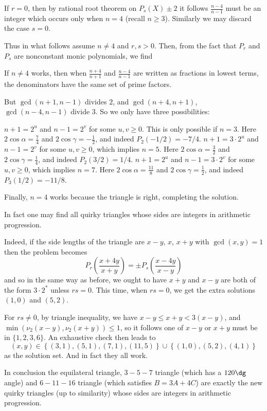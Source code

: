 If $r=0$, then by rational root theorem on $P_s(X) \pm 2$ it follows
$\frac{n-4}{n-1}$ must be an integer which occurs only when $n = 4$ (recall $n \ge 3$).
Similarly we may discard the case $s = 0$.

Thus in what follows assume $n \neq 4$ and $r,s > 0$.
Then, from the fact that $P_r$ and $P_s$ are nonconstant
monic polynomials, we find
\begin{corollary*}
  If $n \neq 4$ works, then when $\frac{n+4}{n+1}$
  and $\frac{n-4}{n-1}$ are written as fractions in lowest terms,
  the denominators have the same set of prime factors.
\end{corollary*}
But $\gcd(n+1, n-1)$ divides $2$, and $\gcd(n+4, n+1)$, $\gcd(n-4,n-1)$ divide $3$.
So we only have three possibilities:
\begin{itemize}
  \ii $n+1 = 2^u$ and $n-1 = 2^v$ for some $u,v \ge 0$.
  This is only possible if $n = 3$.
  Here $2\cos\alpha = \frac74$ and $2\cos\gamma = -\frac12$,
  and indeed $P_2(-1/2) = -7/4$.
  \ii $n+1 = 3 \cdot 2^u$ and $n-1 = 2^v$ for some $u,v \ge 0$,
  which implies $n = 5$.
  Here $2\cos\alpha = \frac32$ and $2\cos\gamma = \frac14$,
  and indeed $P_2(3/2) = 1/4$.
  \ii $n+1 = 2^u$ and $n-1 = 3 \cdot 2^v$ for some $u,v \ge 0$,
  which implies $n = 7$.
  Here $2\cos\alpha = \frac{11}{8}$ and $2\cos\gamma = \frac12$,
  and indeed $P_3(1/2) = -11/8$.
\end{itemize}
Finally, $n=4$ works because the triangle is right, completing the solution.

\begin{remark*}
  In fact one may find all quirky triangles
  whose sides are integers in arithmetic progression.

  Indeed, if the side lengths of the triangle are $x-y$, $x$, $x+y$
  with $\gcd(x,y) = 1$ then the problem becomes
  \[ P_r\left( \frac{x+4y}{x+y} \right) = \pm P_s \left( \frac{x-4y}{x-y} \right) \]
  and so in the same way as before,
  we ought to have $x+y$ and $x-y$ are both of the form $3 \cdot 2^{\ast}$ unless $rs = 0$.
  This time, when $rs=0$, we get the extra solutions $(1,0)$ and $(5,2)$.

  For $rs \neq 0$, by triangle inequality, we have $x-y \le x+y < 3(x-y)$,
  and $\min(\nu_2(x-y), \nu_2(x+y)) \le 1$,
  so it follows one of $x-y$ or $x+y$ must be in $\{1,2,3,6\}$.
  An exhaustive check then leads to
  \[ (x,y) \in \left\{ (3,1), (5,1), (7,1), (11,5) \right\}
    \cup \left\{ (1,0), (5,2), (4,1) \right\} \]
  as the solution set. And in fact they all work.

  In conclusion the equilateral triangle, $3-5-7$ triangle (which has a $120\dg$ angle)
  and $6-11-16$ triangle (which satisfies $B=3A+4C$)
  are exactly the new quirky triangles (up to similarity)
  whose sides are integers in arithmetic progression.
\end{remark*}

